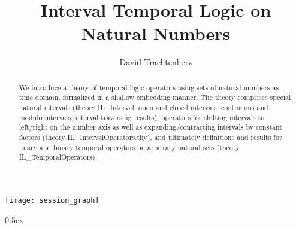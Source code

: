 \documentclass[11pt,a4paper]{article}
\begin{document}
\title{Interval Temporal Logic on Natural Numbers}
\author{David Trachtenherz}
\maketitle

\begin{abstract}
We introduce a theory of temporal logic operators using sets of
natural numbers as time domain, formalized in a shallow embedding
manner. The theory comprises special natural intervals (theory
IL\_Interval: open and closed intervals, continuous and modulo
intervals, interval traversing results), operators for shifting
intervals to left/right on the number axis as well as
expanding/contracting intervals by constant factors (theory
IL\_IntervalOperators.thy), and ultimately definitions and results for
unary and binary temporal operators on arbitrary natural sets (theory
IL\_TemporalOperators).
\end{abstract}

\tableofcontents

\begin{center}
  \texttt{[image: session\_graph]}
\end{center}

\clearpage

\renewcommand{\isamarkupheader}[1]%
{\section{\isabellecontext: #1}\markright{THEORY~``\isabellecontext''}}

\parindent 0pt\parskip 0.5ex

\end{document}

